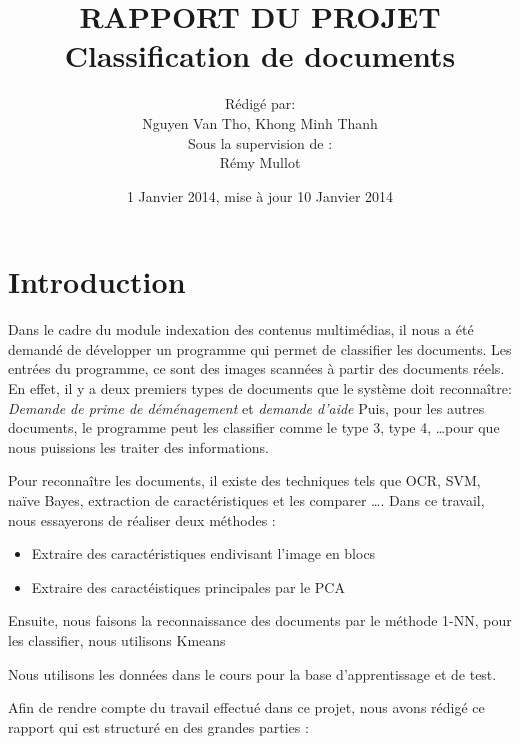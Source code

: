 \documentclass[french,12pt,a4paper,oneside,notitlepage]{report}
\begin{document}
\title{RAPPORT DU PROJET \\
  Classification de documents}
\author{Rédigé par:\\
Nguyen Van Tho, Khong Minh Thanh\vspace{1cm}\\
Sous la supervision de :\\
Rémy Mullot}         
\date{ 1 Janvier 2014, mise à jour 10 Janvier 2014}
\maketitle

\section{Introduction}
%  
Dans le cadre du module indexation des contenus multimédias, 
il nous a été demandé de développer un programme qui permet de classifier les documents.
Les entrées du programme, ce sont des images scannées à partir des documents réels.
En effet, il y a deux premiers types de documents que le système doit reconnaître:
 \textit{Demande de prime de déménagement} et \textit{demande d'aide }
Puis, pour les autres documents, le programme peut les classifier comme le type 3, type 4, \dots pour que nous puissions les traiter des informations.

Pour reconnaître les documents, il existe des techniques tels que OCR, SVM, naïve Bayes, extraction de caractéristiques et les comparer \dots. Dans ce travail, nous essayerons de réaliser deux méthodes : 
\begin{itemize}
\item Extraire des caractéristiques endivisant l'image en blocs
\item Extraire des caractéistiques principales par le PCA
\end{itemize}
Ensuite, nous faisons la reconnaissance des documents par le méthode 1-NN, pour les classifier, nous utilisons Kmeans

Nous utilisons les données dans le cours pour la base d'apprentissage et de test.

Afin de rendre compte du travail effectué dans ce projet, nous avons rédigé ce rapport qui
est structuré en des grandes parties :
\end{document}
